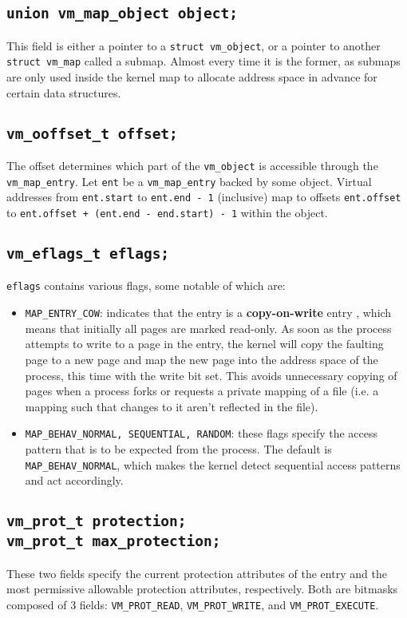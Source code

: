 \documentclass[shortabstract, english]{iithesis}
\begin{document}
\subsection*{\texttt{union vm_map_object object;}}
This field is either a pointer to a \texttt{struct vm_object}, or a
pointer to another \texttt{struct vm_map} called a submap. Almost every
time it is the former, as submaps are only used inside the kernel map to
allocate address space in advance for certain data structures.

\subsection*{\texttt{vm_ooffset_t offset;}}
The offset determines which part of the \texttt{vm_object} is accessible
through the \texttt{vm_map_entry}. Let \texttt{ent} be a
\texttt{vm_map_entry} backed by some object. Virtual addresses from
\texttt{ent.start} to \texttt{ent.end - 1} (inclusive) map to
offsets \texttt{ent.offset} to
\texttt{ent.offset + (ent.end - end.start) - 1}
within the object.

\subsection*{\texttt{vm_eflags_t eflags;}}
\texttt{eflags} contains various flags, some notable of which are:
\begin{itemize}
\item \texttt{MAP_ENTRY_COW}: indicates that the entry is a
  \textbf{copy-on-write} entry \cite[Page~90]{bib:tanenbaum}, which means that
  initially all pages are marked read-only. As soon as the process attempts to
  write to a page in the entry, the kernel will copy the faulting page to a new
  page and map the new page into the address space of the process, this time
  with the write bit set. This avoids unnecessary copying of pages when a
  process forks or requests a private mapping of a file (i.e. a mapping such
  that changes to it aren't reflected in the file).
\item \texttt{MAP_BEHAV_{NORMAL, SEQUENTIAL, RANDOM}}: these flags
  specify the access pattern that is to be expected from the process. The
  default is \texttt{MAP_BEHAV_NORMAL}, which makes the kernel detect
  sequential access patterns and act accordingly.
\end{itemize}

\subsection*{\texttt{vm_prot_t protection;} \\
  \texttt{vm_prot_t max_protection;}}
These two fields specify the current protection attributes of the entry and the
most permissive allowable protection attributes, respectively. Both are bitmasks
composed of 3 fields: \texttt{VM_PROT_READ},
\texttt{VM_PROT_WRITE}, and \texttt{VM_PROT_EXECUTE}.
\end{document}

